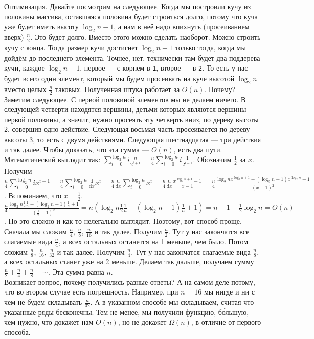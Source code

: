 \documentclass{article}
\newcommand{\pseudo}{PseudoLexer.py:PseudoLexer -x}
\newcommand{\pseudocode}[1]{\texttt{#1}}
\begin{document}
    Оптимизация. Давайте посмотрим на следующее. Когда мы построили кучу из половины массива, оставшаяся половина будет строиться долго, потому что куча уже будет иметь высоту $\log_2n-1$, а нам в неё надо впихнуть (просеиванием вверх) $\frac n2$. Это будет долго. Вместо этого можно сделать наоборот. Можно строить кучу с конца. Тогда размер кучи достигнет $\log_2n-1$ только тогда, когда мы дойдём до последнего элемента. Точнее, нет, технически там будет два поддерева кучи, каждое $\log_2n-1$, первое --- с корнем в \pseudocode{1}, второе --- в \pseudocode{2}. То есть у нас будет всего один элемент, который мы будем просеивать на куче высотой $\log_2n$ вместо целых $\frac n2$ таковых.
    Полученная штука работает за $O(n)$. Почему? Заметим следующее. С первой половиной элементов мы не делаем ничего. В следующей четверти находятся вершины, детьми которых являются вершины первой половины, а значит, нужно просеять эту четверть вниз, по дереву высоты 2, совершив одно действие. Следующая восьмая часть просеивается по дереву высоты 3, то есть с двумя действиями. Следующая шестнадцатая --- три действия и так далее. Чтобы доказать, что эта сумма --- $O(n)$, есть два пути. Математический выглядит так: $\sum\limits_{i=0}^{\log_2n}i\frac n{2^{i+1}}=\frac n4\sum\limits_{i=0}^{\log_2n}i\frac1{2^{i-1}}$. Обозначим $\frac12$ за $x$. Получим $\frac n4\sum\limits_{i=0}^{\log_2n}ix^{i-1}=\frac n4\sum\limits_{i=0}^{\log_2n}\frac{\mathrm d}{\mathrm dx}x^i=\frac n4\frac{\mathrm d}{\mathrm dx}\sum\limits_{i=0}^{\log_2n}x^i=\frac n4\frac{\mathrm d}{\mathrm dx}\frac{x^{\log_2n+1}-1}{x-1}=\frac n4\frac{\log_2nx^{\log_2n+1}-(\log_2n+1)x^{\log_2n}+1}{(x-1)^2}$. Вспоминаем, что $x=\frac12$. $\frac n4\frac{\log_2n\frac12\frac1n-(\log_2n+1)\frac1n+1}{(\frac12-1)^2}=n(\log_2n\frac12\frac1n-(\log_2n+1)\frac1n+1)=n-1-\frac12\log_2n=O(n)$. Но это сложно и как-то нелегально выглядит. Поэтому, вот способ проще. Сначала мы сложим $\frac n4$, $\frac n8$, $\frac n{16}$ и так далее. Получим $\frac n2$. Тут у нас закончатся все слагаемые вида $\frac n4$, а всех остальных останется на 1 меньше, чем было. Потом сложим $\frac n8$, $\frac n{16}$, $\frac n{32}$ и так далее. Получим $\frac n4$. Тут у нас закончатся слагаемые вида $\frac n8$, а всех остальных станет уже на 2 меньше. Делаем так дальше, получаем сумму $\frac n2+\frac n4+\frac n8+\cdots$. Эта сумма равна $n$.\\
    Возникает вопрос, почему получились разные ответы? А на самом деле потому, что во втором случае есть погрешность. Например, при $n=16$ мы нигде и ни с чем не будем складывать $\frac n{32}$. А в указанном способе мы складываем, считая что указанные ряды бесконечны. Тем не менее, мы получили функцию, б\'{о}льшую, чем нужно, что докажет нам $O(n)$, но не докажет $\varOmega(n)$, в отличие от первого способа.
\end{document}
